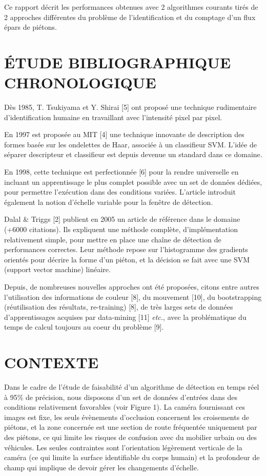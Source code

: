\documentclass{article}
\begin{document}
	Ce rapport décrit les performances obtenues avec 2 algorithmes courants tirés de 2 approches différentes du problème de l'identification et du comptage d'un flux épars de piétons.

\section{\'{E}TUDE BIBLIOGRAPHIQUE CHRONOLOGIQUE}
\label{sec:format}

	Dès 1985, T. Tsukiyama et Y. Shirai [5] ont proposé une technique rudimentaire d'identification humaine en travaillant avec l'intensité pixel par pixel.

	En 1997 est proposée au MIT [4] une technique innovante de description des formes basée sur les ondelettes de Haar, associée à un classifieur SVM. L'idée de séparer descripteur et classifieur est depuis devenue un standard dans ce domaine.

	En 1998, cette technique est perfectionnée [6] pour la rendre universelle en incluant un apprentissage le plus complet possible avec un set de données dédiées, pour permettre l'exécution dans des conditions variées. L'article introduit également la notion d'échelle variable pour la fenêtre de détection.

	Dalal \& Triggs [2] publient en 2005 un article de référence dans le domaine (+6000 citations). Ils expliquent une méthode complète, d'implémentation relativement simple, pour mettre en place une chaîne de détection de performances correctes. Leur méthode repose sur l'histogramme des gradients orientés pour décrire la forme d'un piéton, et la décision se fait avec une SVM (support vector machine) linéaire.

	Depuis, de nombreuses nouvelles approches ont été proposées, citons entre autres l'utilisation des informations de couleur [8], du mouvement [10], du bootstrapping (réutilisation des résultats, re-training) [8], de très larges sets de données d'apprentissages acquises par data-mining [11]  \textit{etc.}, avec la problématique du temps de calcul toujours au coeur du problème [9].


\section{CONTEXTE}
\label{sec:pagestyle}

	Dans le cadre de l'étude de faisabilité d'un algorithme de détection en temps réel à 95\% de précision, nous disposons d'un set de données d'entrées dans des conditions relativement favorables (voir Figure 1). La caméra fournissant ces images est fixe, les seuls évènements d'occlusion concernent les croisements de piétons, et la zone concernée est une section de route fréquentée uniquement par des piétons, ce qui limite les risques de confusion avec du mobilier urbain ou des véhicules. Les seules contraintes sont l'orientation légèrement verticale de la caméra (ce qui limite la surface identifiable du corps humain) et la profondeur de champ qui implique de devoir gérer les changements d'échelle.
	
\end{document}
